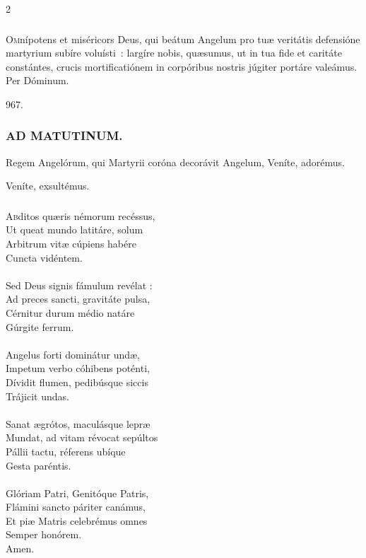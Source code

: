 \documentclass[9pt,twoside]{extarticle}
\begin{document}
\begin{multicols}{2}
{\subsubsection*{\center {}}
\lettrine{O}mnípotens et miséricors Deus, qui beátum Angelum pro tuæ veritátis defensióne martyrium subíre voluísti~: largíre nobis, quæsumus, ut in tua fide et caritáte constántes, crucis mortificatiónem in corpóribus nostris júgiter portáre valeámus. Per Dóminum.

\begin{tightlist}{}
\item {} 967.
\end{tightlist}

\subsubsection*{\center \textsc{AD MATUTINUM.}}
\begin{tightlist}{}
\item {} Regem Angelórum, qui Martyrii coróna decorávit Angelum, \textred{*} Veníte, adorémus.
\item {} Veníte, exsultémus.
\end{tightlist}

\subsubsection*{\center {}}
\lettrine{A}bditos quæris némorum recéssus,\\
Ut queat mundo latitáre, solum\\
Arbitrum vitæ cúpiens habére\\
Cuncta vidéntem.\\
\\
Sed Deus signis fámulum revélat :\\
Ad preces sancti, gravitáte pulsa,\\
Cérnitur durum médio natáre\\
Gúrgite ferrum.\\
\\
Angelus forti dominátur undæ,\\
Impetum verbo cóhibens poténti,\\
Dívidit flumen, pedibúsque siccis\\
Trájicit undas.\\
\\
Sanat ægrótos, maculásque lepræ\\
Mundat, ad vitam révocat sepúltos\\
Pállii tactu, réferens ubíque\\
Gesta paréntis.\\
\\
Glóriam Patri, Genitóque Patris,\\
Flámini sancto páriter canámus,\\
Et piæ Matris celebrémus omnes\\
Semper honórem.\\
Amen.

}
\end{multicols}
\end{document}
